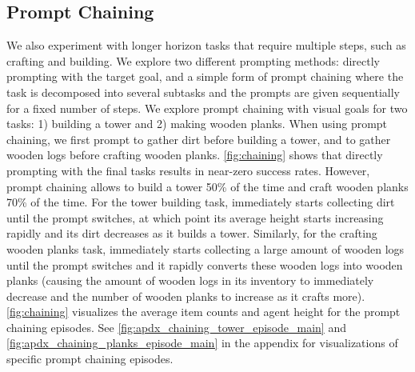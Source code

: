 \subsection{Prompt Chaining}
\label{sec:exp_chaining}
We also experiment with longer horizon tasks that require multiple steps, such as crafting and building. We explore two different prompting methods: directly prompting with the target goal, and a simple form of prompt chaining \citep{Chase2022, wei2022chain, dohan2022language} where the task is decomposed into several subtasks and the prompts are given sequentially for a fixed number of steps. We explore prompt chaining with visual goals for two tasks: 1) building a tower and 2) making wooden planks. When using prompt chaining, we first prompt \agentname{} to gather dirt before building a tower, and to gather wooden logs before crafting wooden planks. \autoref{fig:chaining} shows that directly prompting \agentname{} with the final tasks results in near-zero success rates. However, prompt chaining allows \agentname{} to build a tower 50\% of the time and craft wooden planks 70\% of the time. 
For the tower building task, \agentname{} immediately starts collecting dirt until the prompt switches, at which point its average height starts increasing rapidly and its dirt decreases as it builds a tower. Similarly, for the crafting wooden planks task, \agentname{} immediately starts collecting a large amount of wooden logs until the prompt switches and it rapidly converts these wooden logs into wooden planks (causing the amount of wooden logs in its inventory to immediately decrease and the number of wooden planks to increase as it crafts more). \autoref{fig:chaining} visualizes the average item counts and agent height for the prompt chaining episodes. See \autoref{fig:apdx_chaining_tower_episode_main} and  \autoref{fig:apdx_chaining_planks_episode_main} in the appendix for visualizations of specific prompt chaining episodes.

